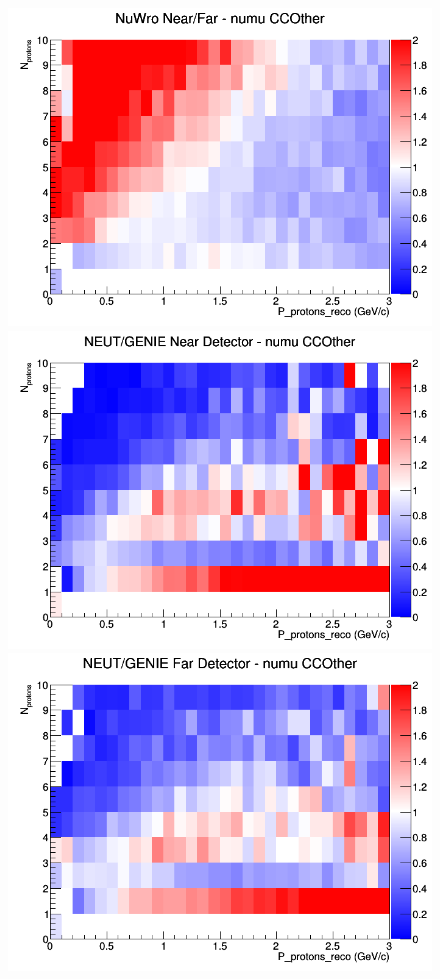 \begin{figure}[h]
\endminipage
{}
\includegraphics[width=\linewidth]{eff_N_P/GAr/protons/ratios/CCOther_NuWro_numu_NF_N_P.png}
\endminipage
\newline
{}
\includegraphics[width=\linewidth]{eff_N_P/GAr/protons/ratios/CCOther_NEUT_GENIE_numu_near_N_P.png}
\endminipage
{}
\includegraphics[width=\linewidth]{eff_N_P/GAr/protons/ratios/CCOther_NEUT_GENIE_numu_far_N_P.png}

\end{figure}
